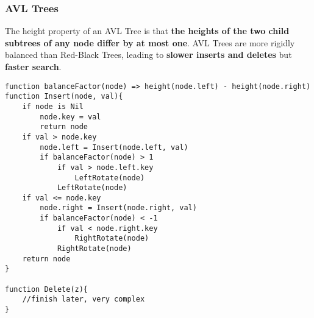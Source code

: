\documentclass{article}
\begin{document}
\begin{figure}[h]
\centering
{}
\end{figure}


\subsubsection{AVL Trees}
The height property of an AVL Tree is that {\bf the heights of the two child subtrees of any node differ by at most one}. AVL Trees are more rigidly balanced than Red-Black Trees, leading to {\bf slower inserts and deletes} but {\bf faster search}.

\begin{minipage}{\linewidth}
\begin{lstlisting}[style=pseudo]
function balanceFactor(node) => height(node.left) - height(node.right)
function Insert(node, val){
	if node is Nil
		node.key = val
		return node
	if val > node.key
		node.left = Insert(node.left, val)
		if balanceFactor(node) > 1
			if val > node.left.key
				LeftRotate(node)
			LeftRotate(node)
	if val <= node.key
		node.right = Insert(node.right, val)
		if balanceFactor(node) < -1
			if val < node.right.key
				RightRotate(node)
			RightRotate(node)
	return node
}

function Delete(z){
	//finish later, very complex
}
\end{lstlisting}
\end{minipage}
\end{document}
